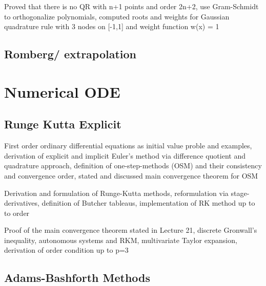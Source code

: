 \documentclass{article}
\theoremstyle{remark}
\begin{document}
\begin{tcolorbox}
  Proved that there is no QR with n+1 points and order 2n+2, use Gram-Schmidt to orthogonalize polynomials, computed roots and weights for Gaussian quadrature rule with 3 nodes on [-1,1] and weight function w(x) = 1


\end{tcolorbox}

\subsection{Romberg/ extrapolation}%
\label{sub:romberg_extrapolation}

\newpage
\section{Numerical ODE}%
\label{sec:numerical_ode}

\subsection{Runge Kutta Explicit }%
\label{sub:runge_kutta_explicit_}

\begin{tcolorbox}
  	First order ordinary differential equations as initial value proble and examples, derivation of explicit and implicit Euler's method via difference quotient and quadrature approach, definition of  one-step-methods (OSM) and their consistency and convergence order, stated and discussed main convergence theorem for OSM
\end{tcolorbox}
 
\begin{tcolorbox}
  Derivation and formulation of Runge-Kutta methods, reformulation via stage-derivatives, definition of Butcher tableaus, implementation of RK method up to to order	
\end{tcolorbox}

\begin{tcolorbox}
  Proof of the main convergence theorem stated in Lecture 21, discrete Gronwall's inequality, autonomous systems and RKM, multivariate Taylor expansion, derivation of order condition up to p=3	
\end{tcolorbox}

\subsection{Adams-Bashforth Methods}%
\label{sub:adams_bashforth_methods}
\end{document}
